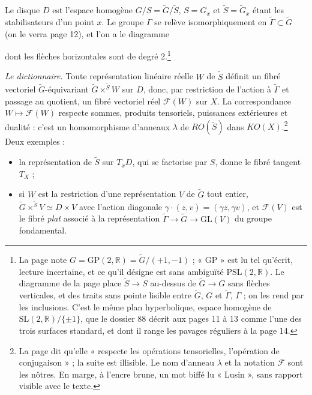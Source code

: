 \documentclass[11pt,a4paper]{article}
\begin{document}
Le disque $D$ est l'espace homogène $G/S = \widetilde{G}/\widetilde{S}$,
$S = G_{x}$ et $\widetilde{S} = \widetilde{G}_{x}$ étant les stabilisateurs
d'un point $x$. Le groupe $\Gamma$ se relève isomorphiquement en
$\widetilde{\Gamma} \subset \widetilde{G}$ (on le verra page 12), et l'on a le
diagramme
dont les flèches horizontales sont de degré 2.\footnote{La page note $G =
\mathrm{GP}(2,\mathbb{R}) = \widetilde{G}/(+1,-1)$ ; « GP » est lu tel
qu'écrit, lecture incertaine, et ce qu'il désigne est sans ambiguïté
$\mathrm{PSL}(2,\mathbb{R})$. Le diagramme de la page place $\widetilde{S}
\to S$ au-dessus de $\widetilde{G} \to G$ sans flèches verticales, et des
traits sans pointe lisible entre $\widetilde{G}$, $G$ et $\widetilde{\Gamma}$,
$\Gamma$ ; on les rend par les inclusions. C'est le même plan hyperbolique,
espace homogène de $\mathrm{SL}(2,\mathbb{R})/\{\pm 1\}$, que le dossier 88
décrit aux pages 11 à 13 comme l'une des trois surfaces standard, et dont il
range les pavages réguliers à la page 14.}

\emph{Le dictionnaire.} Toute représentation linéaire réelle $W$ de
$\widetilde{S}$ définit un fibré vectoriel $\widetilde{G}$-équivariant
$\widetilde{G} \times^{\widetilde{S}} W$ sur $D$, donc, par restriction de
l'action à $\widetilde{\Gamma}$ et passage au quotient, un fibré vectoriel
réel $\mathcal{F}(W)$ sur $X$. La correspondance $W \mapsto \mathcal{F}(W)$
respecte sommes, produits tensoriels, puissances extérieures et dualité :
c'est un homomorphisme d'anneaux $\lambda$ de $RO(\widetilde{S})$ dans
$KO(X)$.\footnote{La page dit qu'elle « respecte les opérations tensorielles,
l'opération de conjugaison » ; la suite est illisible. Le nom d'anneau
$\lambda$ et la notation $\mathcal{F}$ sont les nôtres. En marge, à l'encre
brune, un mot biffé lu « Lusin », sans rapport visible avec le texte.} Deux
exemples :

\begin{itemize}
\item[--] la représentation de $\widetilde{S}$ sur $T_{x}D$, qui se factorise
par $S$, donne le fibré tangent $T_{X}$ ;
\item[--] si $W$ est la restriction d'une représentation $V$ de $\widetilde{G}$
tout entier, $\widetilde{G} \times^{\widetilde{S}} V \simeq D \times V$ avec
l'action diagonale $\gamma \cdot (z, v) = (\gamma z, \gamma v)$, et
$\mathcal{F}(V)$ est le fibré \emph{plat} associé à la représentation
$\widetilde{\Gamma} \to \widetilde{G} \to \mathrm{GL}(V)$ du groupe
fondamental.
\end{itemize}
\end{document}

